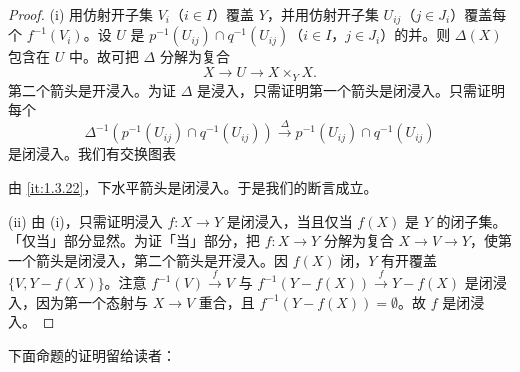 \begin{proof}
(i) 用仿射开子集 $V_i$（$i\in I$）覆盖 $Y$，并用仿射开子集 $U_{ij}$（$j\in J_i$）覆盖每个 $f^{-1}(V_i)$。设 $U$ 是 $p^{-1}(U_{ij})\cap q^{-1}(U_{ij})$（$i\in I$，$j\in J_i$）的并。则 $\Delta(X)$ 包含在 $U$ 中。故可把 $\Delta$ 分解为复合
\[
X\to U\to X\times_Y X.
\]
第二个箭头是开浸入。为证 $\Delta$ 是浸入，只需证明第一个箭头是闭浸入。只需证明每个
\[
\Delta^{-1}(p^{-1}(U_{ij})\cap q^{-1}(U_{ij}))\xrightarrow{\Delta}p^{-1}(U_{ij})\cap q^{-1}(U_{ij})
\]
是闭浸入。我们有交换图表
\begin{center}
\end{center}
由 \ref{it:1.3.22}，下水平箭头是闭浸入。于是我们的断言成立。

(ii) 由 (i)，只需证明浸入 $f\colon X\to Y$ 是闭浸入，当且仅当 $f(X)$ 是 $Y$ 的闭子集。「仅当」部分显然。为证「当」部分，把 $f\colon X\to Y$ 分解为复合 $X\to V\to Y$，使第一个箭头是闭浸入，第二个箭头是开浸入。因 $f(X)$ 闭，$Y$ 有开覆盖 $\{V,Y-f(X)\}$。注意 $f^{-1}(V)\xrightarrow{f}V$ 与 $f^{-1}(Y-f(X))\xrightarrow{f}Y-f(X)$ 是闭浸入，因为第一个态射与 $X\to V$ 重合，且 $f^{-1}(Y-f(X))=\emptyset$。故 $f$ 是闭浸入。
\end{proof}

下面命题的证明留给读者：

